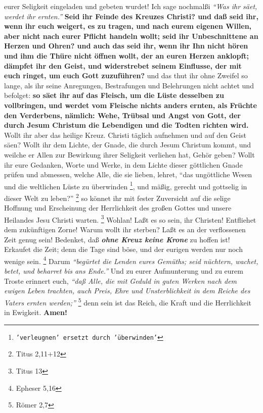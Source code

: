 eurer Seligkeit eingeladen und gebeten wurdet! Ich sage nochmalßi
\textit{"`Was ihr säet, werdet ihr ernten."'}
\textbf{Seid ihr Feinde des Kreuzes Christi? und daß seid
ihr, wenn ihr euch weigert, es zu tragen, und nach eurem eigenen Willen, aber
nicht nach eurer Pflicht handeln wollt; seid ihr
Unbeschnittene an Herzen und
Ohren? und auch das seid ihr, wenn ihr Ihn nicht hören und ihm die Thüre nicht
öffnen wollt, der an euren Herzen anklopft; dämpfet ihr den Geist, und
widerstrebet seinem Einflusse, der mit euch ringet, um euch Gott zuzuführen?}
und das thut ihr ohne Zweifel so lange, als ihr seine Anregungen, Bestrafungen
und Belehrungen nicht achtet und befolget: \textbf{so säet ihr auf das Fleisch,
um die
Lüste desselben zu vollbringen, und werdet vom Fleische nichts anders ernten,
als Früchte den Verderbens, nämlich: Wehe, Trübsal und Angst von Gott, der durch
Jesum Christum die Lebendigen und die Todten richten wird.} Wollt ihr aber
das heilige Kreuz. Christi täglich aufnehmen und auf den Geist säen? Wollt ihr
dem Lichte, der Gnade, die durch Jesum Christum kommt, und weilche er Allen
zur Bewirkung ihrer Seligkeit verliehen hat, Gehör geben? Wollt ihr eure
Gedanken, Worte und Werke, in dem Lichte dieser göttlichen
Gnade prüfen und
abmessen, welche Alle, die sie lieben, lehret,
"`das ungöttliche Wesen und die
weltlichen Lüste zu überwinden
\footnote{\texttt{'verleugnen' ersetzt durch 'überwinden'}}, und mäßig, gerecht
und gottselig in dieser Welt
zu leben?"'
\footnote{Titus 2,11+12}
so könnet ihr mit fester Zuversicht auf
die selige Hoffnung und Erscheinung der Herrlichkeit des großen Gottes und
unsere Heilandes Jesu Christi warten.
\footnote{Titus 13}
Wohlan! Laßt es so
sein, ihr Christen! Entfliehet dem zukünftigen Zorne! Warum wollt ihr sterben?
Laßt es an der verflossenen Zeit genug sein! Bedenket, daß \textbf{\textit{ohne
Kreuz keine
Krone}} zu hoffen ist! Erkaufet die Zeit; denn die
Tage sind böse, und der
eurigen werden nur noch wenige sein.
\footnote{Epheser 5,16}
Darum
\textit{"`begürtet die
Lenden eures Gemüths; seid nüchtern, wachet, betet, und beharret bis ans
Ende."'}
Und zu eurer Aufmunterung und zu eurem Troste erinnert euch,
\textit{"`daß Alle, die mit
Geduld in guten Werken nach dem ewigen Leben trachten, auch Preis, Ehre und
Unsterblichkeit in dem Reiche des Vaters ernten werden;"'}
\footnote{Römer 2,7}
denn sein ist das Reich, die Kraft und die Herrlichkeit in Ewigkeit.
\textbf{Amen!}
